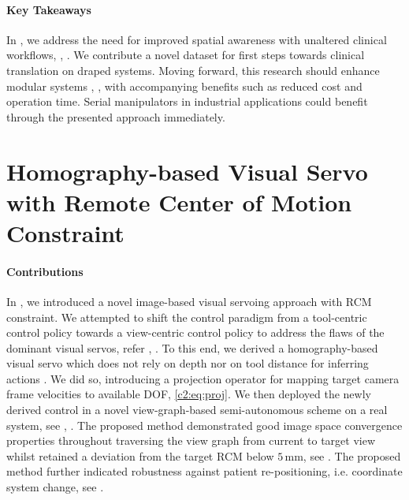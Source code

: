 \paragraph{Key Takeaways}
In , we address the need for improved spatial awareness with unaltered clinical workflows, , . We contribute a novel dataset for first steps towards clinical translation on draped systems. Moving forward, this research should enhance modular systems , , with accompanying benefits such as reduced cost and operation time. Serial manipulators in industrial applications could benefit through the presented approach immediately.

\section[Homography-based Visual Servo with RCM]{Homography-based Visual Servo with Remote Center of Motion Constraint}
\label{con:sec:visual_servo}
\paragraph{Contributions} In , we introduced a novel image-based visual servoing approach with RCM constraint. We attempted to shift the control paradigm from a tool-centric control policy towards a view-centric control policy to address the flaws of the dominant visual servos, refer , . To this end, we derived a homography-based visual servo which does not rely on depth nor on tool distance for inferring actions . We did so, introducing a projection operator for mapping target camera frame velocities to available DOF, \eqref{c2:eq:proj}. We then deployed the newly derived control in a novel view-graph-based semi-autonomous scheme on a real system, see , . The proposed method demonstrated good image space convergence properties throughout traversing the view graph from current to target view whilst retained a deviation from the target RCM below $5\,\text{mm}$, see . The proposed method further indicated robustness against patient re-positioning, i.e. coordinate system change, see .

